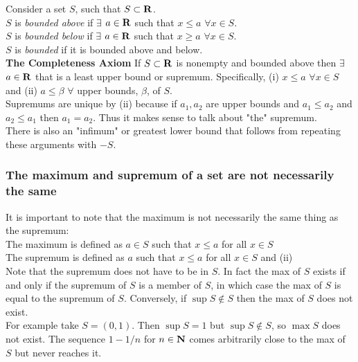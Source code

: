 \documentclass[12pt]{article}
\begin{document}
    Consider a set $S$, such that $S \subset \mathbf{R}$.\\
    $S$ is \emph{bounded above} if $\exists$ $a \in \mathbf{R}$ such that $x \leq a$ $\forall x \in S$.\\
    $S$ is \emph{bounded below} if $\exists$ $a \in \mathbf{R}$ such that $x \geq a$ $\forall x \in S$.\\
    $S$ is \emph{bounded} if it is bounded above and below.\\

    \textbf{The Completeness Axiom} If $S \subset \mathbf{R}$ is nonempty and bounded above then $\exists$ $a \in \mathbf{R}$
    that is a least upper bound or supremum. Specifically, (i) $x \leq a$ $\forall x \in S$ and (ii) $a \leq \beta$ $\forall$ 
    upper bounds, $\beta$, of $S$.\\

    Supremums are unique by (ii) because if $a_1,a_2$ are upper bounds and $a_1 \leq a_2$ and $a_2 \leq a_1$ then $a_1 = a_2$.
    Thus it makes sense to talk about "the" supremum.\\

    There is also an "infimum" or greatest lower bound that follows from repeating these arguments with $-S$.

    \subsubsection{The maximum and supremum of a set are not necessarily the same}
      It is important to note that the maximum is not necessarily the same thing as the supremum:\\

      The maximum is defined as $a \in S$ such that $x \leq a$ for all $x \in S$\\
      The supremum is defined as $a$ such that $x \leq a$ for all $x \in S$ and (ii)\\

      Note that the supremum does not have to be in $S$. In fact the max of $S$ exists if and only if the supremum of $S$
      is a member of $S$, in which case the max of $S$ is equal to the supremum of $S$. Conversely, if $\sup S \notin S$ then
      the max of $S$ does not exist.\\

      For example take $S = (0,1)$. Then $\sup S = 1$ but $\sup S \notin S$, so $\max S$ does not exist. The sequence
      $1 - 1/n$ for $n \in \mathbf{N}$ comes arbitrarily close to the max of $S$ but never reaches it.\\
\end{document}
